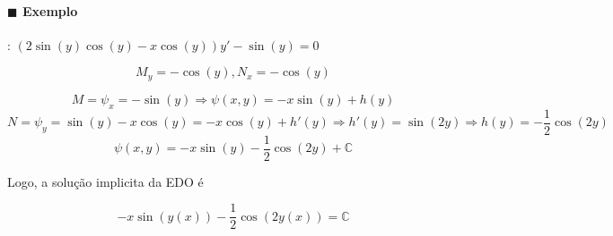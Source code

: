      \paragraph{$\blacksquare$ Exemplo}: $(2 \sin(y) \cos(y) - x \cos (y))y' - \sin(y) = 0$

     \[ M_y = - \cos (y) , N_{x} = - \cos(y) \]

     \[ M = \psi_{x} = - \sin (y) \Rightarrow \psi (x, y) = - x \sin (y) + h(y)\]
     \[ N = \psi_{y} = \sin(y) - x \cos(y) = - x \cos(y) + h'(y) \Rightarrow h'(y) = \sin(2y) \Rightarrow h(y) = -
       \frac{1}{2} \cos(2y) \]
     \[  \psi(x, y) = - x \sin(y) - \frac{1}{2} \cos(2y) + \mathbb{C} \]

     Logo, a solução implicita da EDO é

     \[ -x \sin(y(x)) - \frac{1}{2} \cos(2 y(x)) = \mathbb{C}  \]

     


